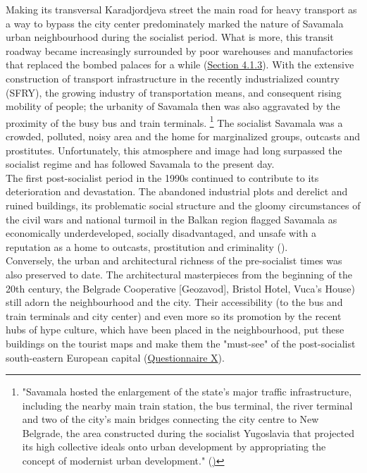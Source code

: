 \documentclass[11pt]{report}
\begin{document}
{{{{Making its transversal Karadjordjeva street the main road for heavy transport as a way to bypass the city center predominately marked the nature of Savamala urban neighbourhood during the socialist period.
What is more, this transit roadway became increasingly surrounded by poor warehouses and manufactories that replaced the bombed palaces for a while (\href{Section 4.1.3}{Section 4.1.3}). 
With the extensive construction of transport infrastructure in the recently industrialized country (SFRY), the growing  industry of transportation means, and consequent rising mobility of people; the urbanity of Savamala then was also aggravated by the proximity of the busy bus and train terminals.
\footnote{"Savamala hosted the enlargement of the state’s major traffic infrastructure, including the nearby main
train station, the bus terminal, the river terminal and two of the city’s main bridges connecting the city centre to New Belgrade, the area constructed during the socialist Yugoslavia that projected its high collective ideals onto urban development by appropriating the concept of modernist urban development." (\href{ref}{\citealt{cvetinovic_engine_2013})}}
The socialist Savamala was a crowded, polluted, noisy area and the home for marginalized groups, outcasts and prostitutes.
Unfortunately, this atmosphere and image had long surpassed the socialist regime and has followed Savamala to the present day.
\\

The first post-socialist period in the 1990s continued to contribute to its deterioration and devastation. The abandoned industrial plots and derelict and ruined buildings, its problematic social structure and the gloomy circumstances of the  civil wars and national turmoil in the Balkan region flagged Savamala as economically underdeveloped, socially disadvantaged, and unsafe with a reputation as a home to outcasts, prostitution and criminality (\href{ref}{\citealt{cvetinovic_engine_2013}}).
\\

Conversely, the urban and architectural richness of the pre-socialist times was also preserved to date. The architectural masterpieces from the beginning of the 20th century, the Belgrade Cooperative [Geozavod], Bristol Hotel, Vuca’s House) still adorn the neighbourhood and the city. Their accessibility (to the bus and train terminals and city center) and even more so its promotion by the recent hubs of hype culture, which have been placed in the neighbourhood, put these buildings on the tourist maps and make them the "must-see" of the post-socialist south-eastern European capital (\href{Questionnaire Experts Savamala}{Questionnaire X}).
\\

}}}}
\end{document}
